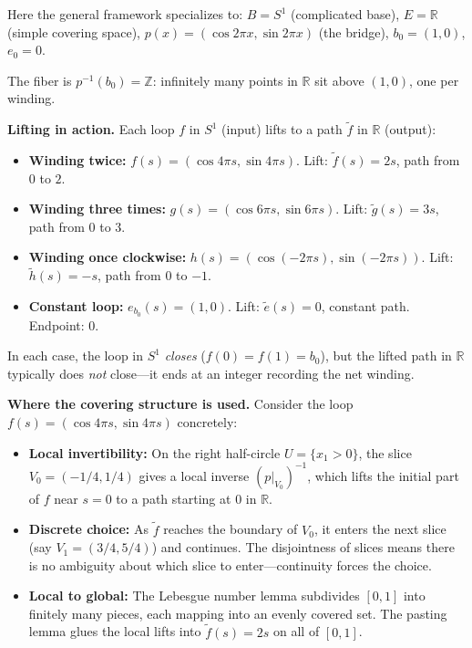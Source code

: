 \documentclass[11pt]{report}
\begin{document}
\begin{exbox}
Here the general framework specializes to: $B = S^1$ (complicated base), $E = \mathbb{R}$ (simple covering space), $p(x) = (\cos 2\pi x, \sin 2\pi x)$ (the bridge), $b_0 = (1,0)$, $e_0 = 0$.

The fiber is $p^{-1}(b_0) = \mathbb{Z}$: infinitely many points in $\mathbb{R}$ sit above $(1,0)$, one per winding.

\textbf{Lifting in action.} Each loop $f$ in $S^1$ (input) lifts to a path $\tilde{f}$ in $\mathbb{R}$ (output):
\begin{itemize}[nosep]
    \item \textbf{Winding twice:} $f(s) = (\cos 4\pi s, \sin 4\pi s)$. Lift: $\tilde{f}(s) = 2s$, path from $0$ to $2$.
    \item \textbf{Winding three times:} $g(s) = (\cos 6\pi s, \sin 6\pi s)$. Lift: $\tilde{g}(s) = 3s$, path from $0$ to $3$.
    \item \textbf{Winding once clockwise:} $h(s) = (\cos(-2\pi s), \sin(-2\pi s))$. Lift: $\tilde{h}(s) = -s$, path from $0$ to $-1$.
    \item \textbf{Constant loop:} $e_{b_0}(s) = (1, 0)$. Lift: $\tilde{e}(s) = 0$, constant path. Endpoint: $0$.
\end{itemize}
In each case, the loop in $S^1$ \emph{closes} ($f(0) = f(1) = b_0$), but the lifted path in $\mathbb{R}$ typically does \emph{not} close---it ends at an integer recording the net winding.

\textbf{Where the covering structure is used.} Consider the loop $f(s) = (\cos 4\pi s, \sin 4\pi s)$ concretely:
\begin{itemize}[nosep]
    \item \textbf{Local invertibility:} On the right half-circle $U = \{x_1 > 0\}$, the slice $V_0 = (-1/4, 1/4)$ gives a local inverse $(p|_{V_0})^{-1}$, which lifts the initial part of $f$ near $s = 0$ to a path starting at $0$ in $\mathbb{R}$.
    \item \textbf{Discrete choice:} As $\tilde{f}$ reaches the boundary of $V_0$, it enters the next slice (say $V_1 = (3/4, 5/4)$) and continues. The disjointness of slices means there is no ambiguity about which slice to enter---continuity forces the choice.
    \item \textbf{Local to global:} The Lebesgue number lemma subdivides $[0, 1]$ into finitely many pieces, each mapping into an evenly covered set. The pasting lemma glues the local lifts into $\tilde{f}(s) = 2s$ on all of $[0, 1]$.
\end{itemize}
\end{exbox}
\end{document}
